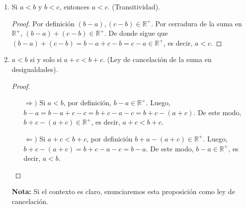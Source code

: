 \documentclass[11pt]{article}
\newcommand{\R}{\mathbb{R}}
\begin{document}
\begin{enumerate}[label=\alph*)]
    \item Si $a<b$ y $b<c$, entonces $a<c$. (Transitividad).
    \vspace{-1em}\begin{proof} 
        Por definición $(b-a) , (c-b) \in \R^+$. Por cerradura de la suma en $\R^+$, $(b-a) + (c-b) \in \R^+$. De donde sigue que $(b-a)+(c-b)=b-a+c-b=c-a\in \R^+$, es decir, $a<c$.
    \end{proof} \vspace{-1em}

    \item $a<b$ si y solo si $a+c<b+c$. (Ley de cancelación de la suma en desigualdades).
    
    \vspace{-1em}\begin{proof} \leavevmode
    \begin{itemize}
        \item[$\Rightarrow)$] Si $a<b$, por definición, $b-a \in \R^+$. Luego, $b-a=b-a+c-c=b+c-a-c=b+c-(a+c)$. De este modo, $b+c-(a+c)\in \R^+$, es decir, $a+c<b+c$.
        \item[$\Leftarrow)$] Si $a+c<b+c$, por definición $b+a-(a+c)\in \R^+$. Luego, $b+c-(a+c)=b+c-a-c=b-a$. De este modo, $b-a\in \R^+$, es decir, $a<b$. \qedhere
        \end{itemize}    
    \end{proof} \vspace{-1em}
    \textbf{Nota:} Si el contexto es claro, enunciaremos esta proposición como ley de cancelación.


\end{enumerate}
\end{document}
